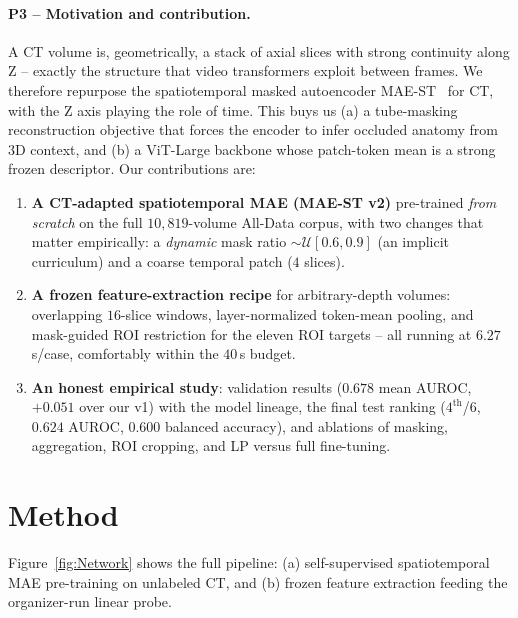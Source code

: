 \documentclass[runningheads]{llncs}
\begin{document}
\paragraph{P3 -- Motivation and contribution.}
A CT volume is, geometrically, a stack of axial slices with strong continuity
along Z -- exactly the structure that video transformers exploit between frames.
We therefore repurpose the spatiotemporal masked autoencoder MAE-ST~\cite{maest}
for CT, with the Z axis playing the role of time. This buys us (a) a
tube-masking reconstruction objective that forces the encoder to infer occluded
anatomy from 3D context, and (b) a ViT-Large backbone whose patch-token mean is
a strong frozen descriptor. Our contributions are:
\begin{enumerate}
  \item \textbf{A CT-adapted spatiotemporal MAE (MAE-ST v2)} pre-trained
        \emph{from scratch} on the full $10{,}819$-volume All-Data corpus, with
        two changes that matter empirically: a \emph{dynamic} mask ratio
        $\sim\mathcal{U}[0.6,0.9]$ (an implicit curriculum) and a coarse
        temporal patch ($4$ slices).
  \item \textbf{A frozen feature-extraction recipe} for arbitrary-depth volumes:
        overlapping $16$-slice windows, layer-normalized token-mean pooling, and
        mask-guided ROI restriction for the eleven ROI targets -- all running at
        $6.27$\,s/case, comfortably within the $40$\,s budget.
  \item \textbf{An honest empirical study}: validation results ($0.678$ mean
        AUROC, $+0.051$ over our v1) with the model lineage, the final test
        ranking ($4^{\text{th}}$/6, $0.624$ AUROC, $0.600$ balanced accuracy),
        and ablations of masking, aggregation, ROI cropping, and LP versus full
        fine-tuning.
\end{enumerate}

\section{Method}

Figure~\ref{fig:Network} shows the full pipeline: (a) self-supervised
spatiotemporal MAE pre-training on unlabeled CT, and (b) frozen feature
extraction feeding the organizer-run linear probe.
\end{document}
